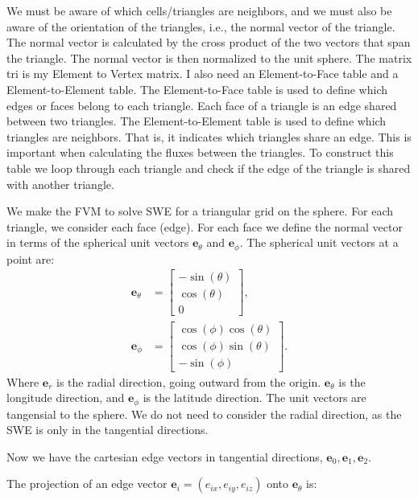 We must be aware of which cells/triangles are neighbors, and we must also be aware of the orientation of the triangles, i.e., the normal vector of the triangle.
The normal vector is calculated by the cross product of the two vectors that span the triangle.
The normal vector is then normalized to the unit sphere.
The matrix tri is my Element to Vertex matrix. 
I also need an Element-to-Face table and a Element-to-Element table.
The Element-to-Face table is used to define which edges or faces belong to each triangle.
Each face of a triangle is an edge shared between two triangles.
The Element-to-Element table is used to define which triangles are neighbors. 
That is, it indicates which triangles share an edge. This is important when calculating the fluxes between the triangles.
To construct this table we loop through each triangle and check if the edge of the triangle is shared with another triangle.


We make the FVM to solve SWE for a triangular grid on the sphere.
For each triangle, we consider each face (edge).
For each face we define the normal vector in terms of the spherical unit vectors $\mathbf{e}_\theta$ and $\mathbf{e}_\phi$.
The spherical unit vectors at a point are:
\begin{align*}
    \mathbf{e}_\theta &= \begin{bmatrix}
        - \sin(\theta) \\
        \cos(\theta) \\
        0
    \end{bmatrix}, \\
    \mathbf{e}_\phi &= \begin{bmatrix}
        \cos(\phi) \cos(\theta) \\
        \cos(\phi) \sin(\theta) \\
        -\sin(\phi)
    \end{bmatrix}.
\end{align*}
Where $\mathbf{e}_r$ is the radial direction, going outward from the origin.
$\mathbf{e}_\theta$ is the longitude direction, and $\mathbf{e}_\phi$ is the latitude direction.
The unit vectors are tangensial to the sphere.
We do not need to consider the radial direction, as the SWE is only in the tangential directions.

Now we have the cartesian edge vectors in tangential directions, $\mathbf{e}_0, \mathbf{e}_1, \mathbf{e}_2$.

The projection of an edge vector \( \mathbf{e}_i = (e_{ix}, e_{iy}, e_{iz}) \) onto \( \mathbf{e}_\theta \) is:

